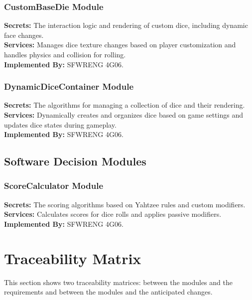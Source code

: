 \documentclass[12pt, titlepage]{article}
\begin{document}
\subsubsection{CustomBaseDie Module}
\textbf{Secrets:} The interaction logic and rendering of custom dice, including dynamic face changes.\\
\textbf{Services:} Manages dice texture changes based on player customization and handles physics and collision for rolling.\\
\textbf{Implemented By:} SFWRENG 4G06.

\subsubsection{DynamicDiceContainer Module}
\textbf{Secrets:} The algorithms for managing a collection of dice and their rendering.\\
\textbf{Services:} Dynamically creates and organizes dice based on game settings and updates dice states during gameplay.\\
\textbf{Implemented By:} SFWRENG 4G06.

\subsection{Software Decision Modules}
\subsubsection{ScoreCalculator Module}
\textbf{Secrets:} The scoring algorithms based on Yahtzee rules and custom modifiers.\\
\textbf{Services:} Calculates scores for dice rolls and applies passive modifiers.\\
\textbf{Implemented By:} SFWRENG 4G06.






\section{Traceability Matrix} \label{SecTM}

This section shows two traceability matrices: between the modules and the
requirements and between the modules and the anticipated changes.
\end{document}
